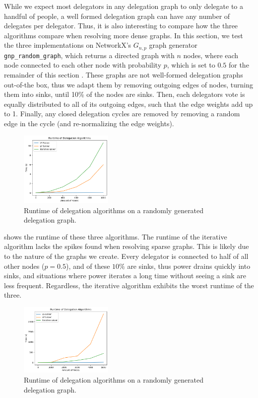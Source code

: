 While we expect most delegators in any delegation graph to only delegate to a handful of people, a well formed delegation graph can have any number of delegates per delegator. Thus, it is also interesting to compare how the three algorithms compare when resolving more dense graphs. In this section, we test the three implementations on NetworkX's $G_{n,p}$ graph generator \texttt{gnp\_random\_graph}, which returns a directed graph with $n$ nodes, where each node connected to each other node with probability $p$, which is set to $0.5$ for the remainder of this section \cite{hagbergExploringNetworkStructure2008}. These graphs are not well-formed delegation graphs out-of-the box, thus we adapt them by removing outgoing edges of nodes, turning them into sinks, until 10\% of the nodes are sinks. Then, each delegators vote is equally distributed to all of its outgoing edges, such that the edge weights add up to 1. Finally, any closed delegation cycles are removed by removing a random edge in the cycle (and re-normalizing the edge weights). 

\begin{figure}[h]
    \centering
    \includegraphics[width=0.4\textwidth]{0-1000_dense}
    \caption{Runtime of delegation algorithms on a randomly generated delegation graph.}
    \label{fig:dense-small}
\end{figure}

 shows the runtime of these three algorithms. The runtime of the iterative algorithm lacks the spikes found when resolving sparse graphs. This is likely due to the nature of the graphs we create. Every delegator is connected to half of all other nodes ($p = 0.5$), and of these $10\%$ are sinks, thus power drains quickly into sinks, and situations where power iterates a long time without seeing a sink are less frequent. Regardless, the iterative algorithm exhibits the worst runtime of the three. 

\begin{figure}[h]
    \centering
    \includegraphics[width=0.4\textwidth]{0-5000_dense}
    \caption{Runtime of delegation algorithms on a randomly generated delegation graph.}
    \label{fig:dense-large}
\end{figure}

